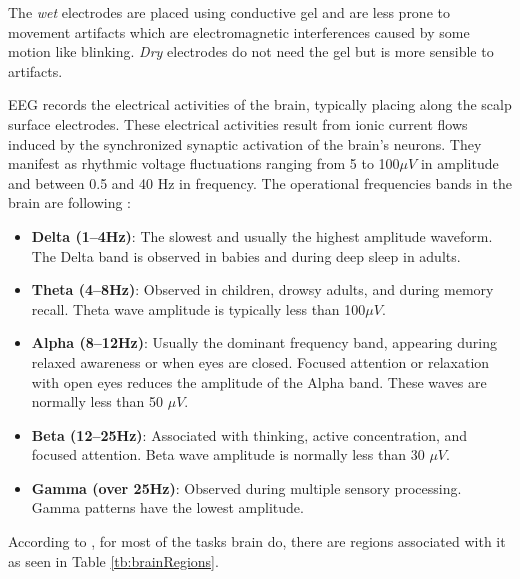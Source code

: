 		\par The \textit{wet} electrodes are placed using conductive gel and are less prone to movement artifacts which are electromagnetic interferences caused by some motion like blinking. \textit{Dry} electrodes do not need the gel but is more sensible to artifacts.
		
		\par EEG records the electrical activities of the brain, typically placing along the scalp surface electrodes. These electrical activities result from ionic current flows induced by the synchronized synaptic activation of the brain's neurons. They manifest as rhythmic voltage fluctuations ranging from 5 to 100$\mu V$ in amplitude and between 0.5 and 40 Hz in frequency\cite{JALALYBIDGOLY2020101788}. The operational frequencies bands in the brain are following \cite{sanei2021eeg}:
		
		\begin{itemize}
			\item \textbf{Delta (1–4Hz)}: The slowest and usually the highest amplitude waveform. The Delta band is observed in babies and during deep sleep in adults.
			
			\item \textbf{Theta (4–8Hz)}: Observed in children, drowsy adults, and during memory recall. Theta wave amplitude is typically less than 100$\mu V$.
			
			\item \textbf{Alpha (8–12Hz)}: Usually the dominant frequency band, appearing during relaxed awareness or when eyes are closed. Focused attention or relaxation with open eyes reduces the amplitude of the Alpha band. These waves are normally less than 50 $\mu V$.
			
			\item \textbf{Beta (12–25Hz)}: Associated with thinking, active concentration, and focused attention. Beta wave amplitude is normally less than 30 $\mu V$.
			
			\item \textbf{Gamma (over 25Hz)}: Observed during multiple sensory processing. Gamma patterns have the lowest amplitude.
		\end{itemize}
		
		\par According to \cite{JALALYBIDGOLY2020101788}, for most of the tasks brain do, there are regions associated with it as seen in Table \ref{tb:brainRegions}.
		
		
